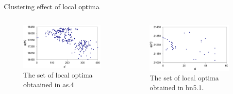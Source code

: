 \documentclass[aspectratio=169,xcolor=dvipsnames]{beamer}
\begin{document}
\begin{frame}{Clustering effect of local optima}
\begin{columns}
 \begin{figure}
	\includegraphics[scale=0.4]{multistart_klaster}
	\caption{The set of local optima obtaained in as.4 } 	
  \end{figure}
   \begin{figure}
	\includegraphics[scale=0.4]{klaster_bn5_1.png}
	\caption{The set of  local optima obtained in bn5.1.} 
  \end{figure}
 \end{columns}  
\end{frame}

\end{document}
